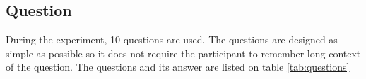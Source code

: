 \subsection{Question}
During the experiment, 10 questions are used. The questions are designed as simple as possible so it does not require the participant to remember long context of the question.
The questions and its answer are listed on table \ref{tab:questions}


